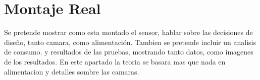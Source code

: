 \section{Montaje Real}

Se pretende mostrar como esta montado el sensor, hablar sobre las decisiones de diseño, tanto
camara, como alimentación. Tambien se pretende incluir un analisis de consumo. y resultados de las pruebas, mostrando tanto datos, como imagenes de los resultados. En este apartado la teoria se basara mas que nada en alimentacion y detalles sombre las camaras. \\